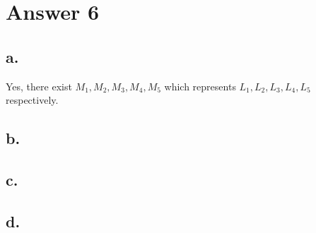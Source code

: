 \documentclass[12pt]{article}
\begin{document}
\section*{Answer 6}

\subsection*{a.}

Yes, there exist $M_1, M_2, M_3, M_4, M_5$ which represents $L_1, L_2, L_3, L_4, L_5$ respectively.

\subsection*{b.}

\subsection*{c.}

\subsection*{d.}


\end{document}
